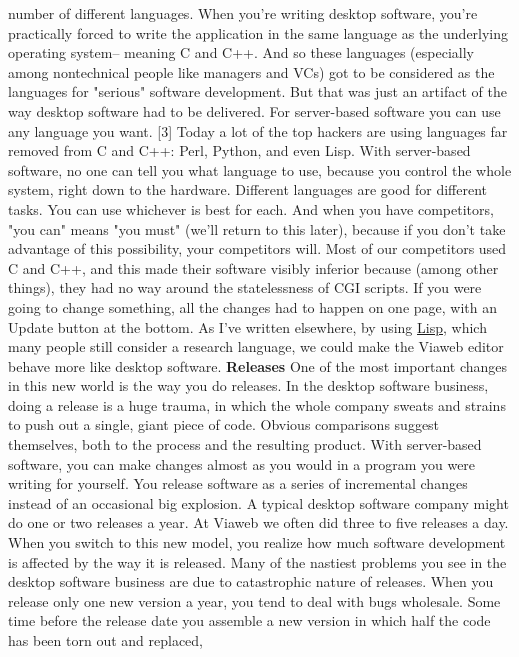 number of different languages.  When you're writing desktop software,
you're practically forced to write the application in the same
language as the underlying operating system-- meaning C and C++.
And so these languages (especially among nontechnical people like
managers and VCs) got to be considered as the languages for "serious"
software development.  But that was just an artifact of the way
desktop software had to be delivered.  For server-based software
you can use any language you want. [3]  Today a lot of the top
hackers are using languages far removed from C and C++:  Perl,
Python, and even Lisp.
With server-based software, no one can tell you what language to
use, because you control the whole system, right down to the
hardware.  Different languages are good for different tasks.  You
can use whichever is best for each.  And when you have competitors,
"you can" means "you must" (we'll return to this later), because
if you don't take advantage of this possibility, your competitors
will.
Most of our competitors used C and C++, and this made their software
visibly inferior because (among other things), they had no way
around the statelessness of CGI scripts.  If you were going to
change something, all the changes had to happen on one page, with
an Update button at the bottom.  As I've written elsewhere, by
using \href{http://www.paulgraham.com/avg.html}{Lisp}, which many people still consider 
a research language,
we could make the Viaweb editor behave more like desktop software.
\textbf{Releases}
One of the most important changes in this new world is the way you
do releases. In the desktop software business, doing a release is
a huge trauma, in which the whole company sweats and strains to
push out a single, giant piece of code.  Obvious comparisons suggest
themselves, both to the process and the resulting product.
With server-based software, you can make changes almost as you
would in a program you were writing for yourself.  You release
software as a series of incremental changes instead of an occasional
big explosion. A typical desktop software company might do one or
two releases a year.  At Viaweb we often did three to five releases
a day.
When you switch to this new model, you realize how much software
development is affected by the way it is released.  Many of the
nastiest problems you see in the desktop software business are due
to catastrophic nature of releases.
When you release only one new version a year, you tend to deal with
bugs wholesale.  Some time before the release date you assemble a
new version in which half the code has been torn out and replaced,
